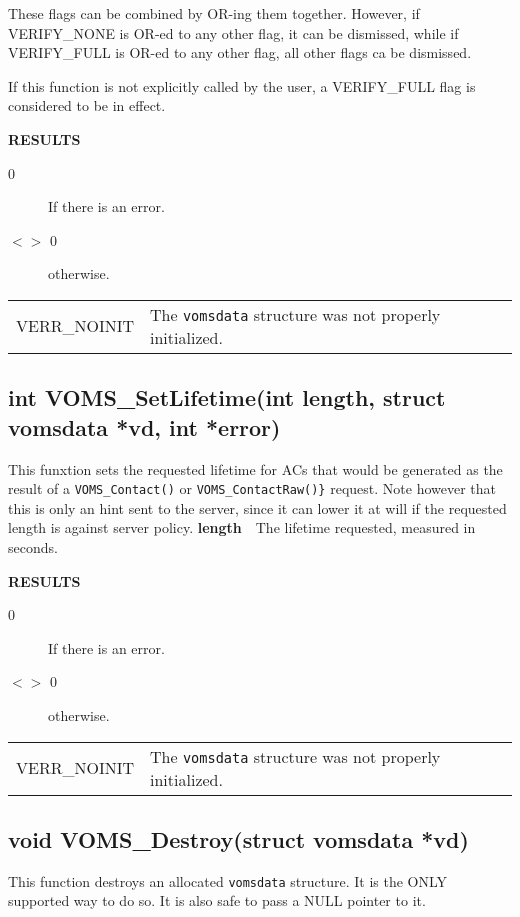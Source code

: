 \documentclass[a4paper]{book}
\newcommand{\result}{\noindent \textbf{RESULTS}\newline}
\newcommand{\parameter}[1]{\newline\textbf{#1}\ \ }
\begin{document}
These flags can be combined by OR-ing them together.  However, if
VERIFY\_NONE is OR-ed to any other flag, it can be dismissed, while if
VERIFY\_FULL is OR-ed to any other flag, all other flags ca be
dismissed.

If this function is not explicitly called by the user, a VERIFY\_FULL
flag is considered to be in effect.

\result
\begin{description}
\item[0] If there is an error.
\item[$<>$ 0] otherwise.
\end{description}

\bigskip\begin{tabular}{lp{3in}}
VERR\_NOINIT & The \verb|vomsdata| structure was not properly
initialized.\\
\end{tabular}

\subsection{int VOMS\_SetLifetime(int length, struct vomsdata *vd, int *error)}

This funxtion sets the requested lifetime for ACs that would be
generated as the result of a \verb|VOMS_Contact()| or
\verb|VOMS_ContactRaw()}|
  request.  Note however that this is only an hint sent to the server,
  since it can lower it at will if the requested length is against
  server policy.
\parameter{length}{The lifetime requested, measured in seconds.}

\result
\begin{description}
\item[0] If there is an error.
\item[$<>$ 0] otherwise.
\end{description}

\bigskip\begin{tabular}{lp{3in}}
VERR\_NOINIT & The \verb|vomsdata| structure was not properly
initialized.\\
\end{tabular}

\subsection{void VOMS\_Destroy(struct vomsdata *vd)}

This function destroys an allocated \verb|vomsdata| structure. It is
the ONLY supported way to do so.  It is also safe to pass a NULL
pointer to it.
\end{document}
